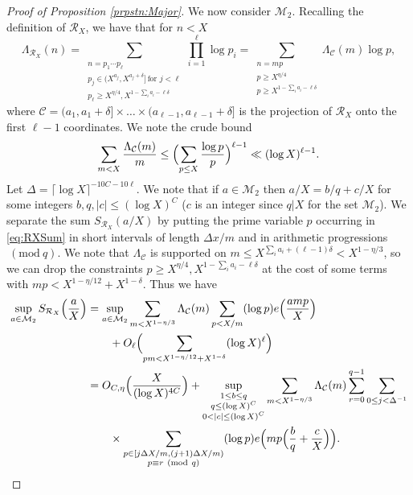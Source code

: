 \documentclass[10pt]{amsart}
\theoremstyle{plain}
\numberwithin{sblmm}{thrm}
\numberwithin{equation}{section}
\newcommand{\Mod}[1]{\ (\mathrm{mod}\ #1)}
\begin{document}
\begin{proof}[Proof of Proposition \ref{prpstn:Major}]
We now consider $\mathcal{M}_2$. Recalling the definition of $\mathcal{R}_X$, we have that for $n<X$
\begin{equation}
\Lambda_{\mathcal{R}_X}(n)=\sum_{\substack{n=p_1\cdots p_\ell\\ p_j\in (X^{a_j},X^{a_j+\delta}]\,\text{for $j<\ell$}\\ p_\ell\ge X^{\eta/4},X^{1-\sum_ia_i-\ell\delta}}}\prod_{i=1}^\ell \log{p_i}=\sum_{\substack{n=mp\\ p\ge X^{\eta/4}\\ p\ge X^{1-\sum_ia_i-\ell\delta}}}\Lambda_{\mathcal{C}}(m)\log{p},
\label{eq:RXSum}
\end{equation}
 where $\mathcal{C}=(a_1,a_1+\delta]\times\dots\times(a_{\ell-1},a_{\ell-1}+\delta]$ is the projection of $\mathcal{R}_X$ onto the first $\ell-1$ coordinates. We note the crude bound
\begin{equation}
\sum_{m<X}\frac{\Lambda_{\mathcal{C}}(m)}{m}\le \Bigl(\sum_{p\le X}\frac{\log{p}}{p}\Bigr)^{\ell-1} \ll (\log{X})^{\ell-1}.
\label{eq:Crude}
\end{equation}
Let $\Delta=\lceil\log{X}\rceil^{-10C-10\ell}$. We note that if $a\in\mathcal{M}_2$ then $a/X=b/q+c/X$ for some integers $b,q,|c|\le (\log{X})^C$ ($c$ is an integer since $q|X$ for the set $\mathcal{M}_2$). We separate the sum $S_{\mathcal{R}_X}(a/X)$ by putting the prime variable $p$ occurring in \eqref{eq:RXSum} in short intervals of length $\Delta x/m$ and in arithmetic progressions $\Mod{q}$. We note that $\Lambda_{\mathcal{C}}$ is supported on $m\le X^{\sum_i a_i+(\ell-1)\delta}< X^{1-\eta/3}$, so we can drop the constraints $p\ge X^{\eta/4},X^{1-\sum_{i}a_i-\ell\delta}$ at the cost of some terms with $mp<X^{1-\eta/12}+X^{1-\delta}$. Thus we have
\begin{align*}
\sup_{a\in\mathcal{M}_2}S_{\mathcal{R}_X}\Bigl(\frac{a}{X}\Bigr)
&=\sup_{a\in\mathcal{M}_2}\sum_{m<X^{1-\eta/3}}\Lambda_{\mathcal{C}}(m)\sum_{p< X/m}(\log{p})e\Bigl(\frac{a m p}{X}\Bigr)\\
&\qquad +O_\ell\Bigl(\sum_{pm<X^{1-\eta/12}+X^{1-\delta}}(\log{X})^{\ell}\Bigr)\\
&=O_{C,\eta}\Bigl(\frac{X}{(\log{X})^{4C}}\Bigr)+\sup_{\substack{1\le b\le q\\ q\le (\log{X})^C \\ 0<|c|\le (\log{X})^C}}\sum_{m<X^{1-\eta/3}}\Lambda_{\mathcal{C}}(m)\sum_{r=0}^{q-1}\sum_{0\le j< \Delta^{-1}}\\ 
&\qquad\times\sum_{\substack{p\in [j\Delta X/m,(j+1)\Delta X/m) \\ p\equiv r\Mod{q}}}(\log{p})e\Bigl(mp\Bigl(\frac{b}{q}+\frac{c}{X}\Bigr)\Bigr).
\end{align*}
%


\end{proof}
\end{document}
